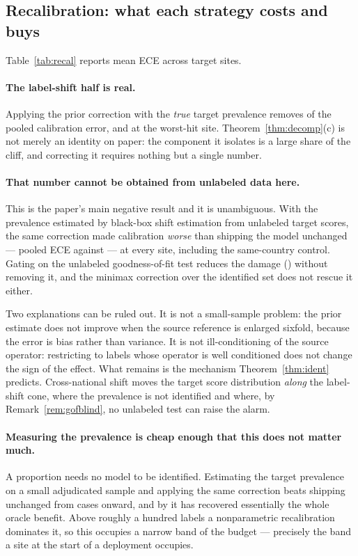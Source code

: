 \subsection{Recalibration: what each strategy costs and buys}
\label{sec:results-recal}

Table~\ref{tab:recal} reports mean ECE across target sites.


\paragraph{The label-shift half is real.}
Applying the prior correction with the \emph{true} target prevalence removes
 of the pooled calibration error, and
 at the worst-hit site.  Theorem~\ref{thm:decomp}(c) is not
merely an identity on paper: the component it isolates is a large share of the
cliff, and correcting it requires nothing but a single number.

\paragraph{That number cannot be obtained from unlabeled data here.}
This is the paper's main negative result and it is unambiguous.  With the
prevalence estimated by black-box shift estimation from unlabeled target
scores, the same correction made calibration \emph{worse} than shipping the
model unchanged --- pooled ECE  against  --- at
every site, including the same-country control.  Gating on the unlabeled
goodness-of-fit test reduces the damage () without removing
it, and the minimax correction over the identified set does not rescue it
either.

Two explanations can be ruled out.  It is not a small-sample problem: the prior
estimate does not improve when the source reference is enlarged sixfold, because
the error is bias rather than variance.  It is not ill-conditioning of the
source operator: restricting to labels whose operator is well conditioned does
not change the sign of the effect.  What remains is the mechanism
Theorem~\ref{thm:ident} predicts.  Cross-national shift moves the target score
distribution \emph{along} the label-shift cone, where the prevalence is not
identified and where, by Remark~\ref{rem:gofblind}, no unlabeled test can raise
the alarm.

\paragraph{Measuring the prevalence is cheap enough that this does not matter
much.}
A proportion needs no model to be identified.  Estimating the target prevalence
on a small adjudicated sample and applying the same correction beats shipping
unchanged from  cases onward, and by
 it has recovered essentially the whole oracle benefit.
Above roughly a hundred labels a nonparametric recalibration dominates it, so
this occupies a narrow band of the budget --- precisely the band a site at the
start of a deployment occupies.

